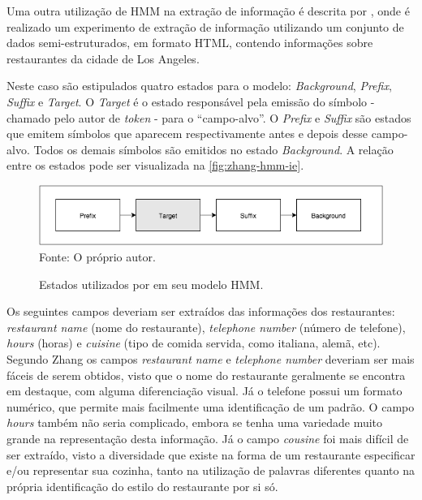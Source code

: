 
Uma outra utilização de HMM na extração de informação é descrita por \cite{Zhang-HMM-IE}, onde é realizado um experimento de extração de informação utilizando um conjunto de dados semi-estruturados, em formato HTML, contendo informações sobre restaurantes da cidade de Los Angeles.

Neste caso são estipulados quatro estados para o modelo: \textit{Background}, \textit{Prefix}, \textit{Suffix} e \textit{Target}. O \textit{Target} é o estado responsável pela emissão do símbolo - chamado pelo autor de \textit{token} - para o ``campo-alvo''. O \textit{Prefix} e \textit{Suffix} são estados que emitem símbolos que aparecem respectivamente antes e depois desse campo-alvo. Todos os demais símbolos são emitidos no estado \textit{Background}. A relação entre os estados pode ser visualizada na \autoref{fig:zhang-hmm-ie}.

\begin{figure}
    \centering
    \caption{Estados utilizados por \cite{Zhang-HMM-IE} em seu modelo HMM.}
    \label{fig:zhang-hmm-ie}
    \includegraphics[width=0.8\linewidth]{./assets/images/zhang-hmm-ie}
    \center\footnotesize{Fonte: O próprio autor.}
\end{figure}

Os seguintes campos deveriam ser extraídos das informações dos restaurantes: \textit{restaurant name} (nome do restaurante), \textit{telephone number} (número de telefone), \textit{hours} (horas) e \textit{cuisine} (tipo de comida servida, como italiana, alemã, etc). Segundo Zhang \cite{Zhang-HMM-IE} os campos \textit{restaurant name} e \textit{telephone number} deveriam ser mais fáceis de serem obtidos, visto que o nome do restaurante geralmente se encontra em destaque, com alguma diferenciação visual. Já o telefone possui um formato numérico, que permite mais facilmente uma identificação de um padrão. O campo \textit{hours} também não seria complicado, embora se tenha uma variedade muito grande na representação desta informação. Já o campo \textit{cousine} foi mais difícil de ser extraído, visto a diversidade que existe na forma de um restaurante especificar e/ou representar sua cozinha, tanto na utilização de palavras diferentes quanto na própria identificação do estilo do restaurante por si só.

